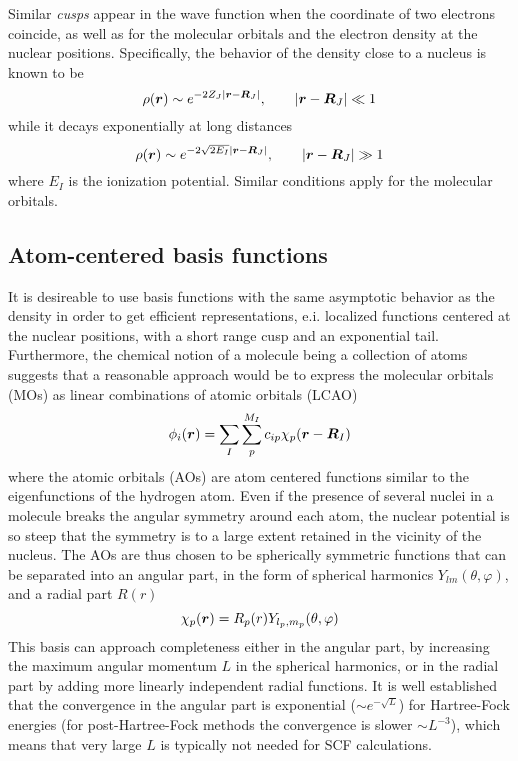 Similar \emph{cusps} appear in the wave function when the coordinate of two electrons coincide, 
as well as for the molecular orbitals and the electron density at the nuclear positions. 
Specifically, the behavior of the density close to a nucleus is known to be
\begin{equation}
    \rho(\boldsymbol r) \sim e^{-2Z_J|\boldsymbol r-\boldsymbol R_J|}, \qquad |\boldsymbol r-\boldsymbol R_J| \ll 1
\end{equation}
while it decays exponentially at long distances 
\begin{equation}
    \rho(\boldsymbol r) \sim e^{-2\sqrt{2E_I}|\boldsymbol r-\boldsymbol R_J|}, \qquad |\boldsymbol r - \boldsymbol R_J| \gg 1
\end{equation}
where $E_I$ is the ionization potential. Similar conditions apply for the molecular orbitals.

\subsection{Atom-centered basis functions}
It is desireable to use basis functions with the same asymptotic behavior as the density in order 
to get efficient representations, e.i. localized functions centered at the nuclear positions, with 
a short range cusp and an exponential tail. Furthermore, the chemical notion of a molecule being 
a collection of atoms suggests that a reasonable approach would be to express the molecular orbitals 
(MOs) as linear combinations of atomic orbitals (LCAO)
\begin{equation}
    \phi_i(\boldsymbol r) = \sum_I\sum_p^{M_I} c_{ip}\chi_p(\boldsymbol r-\boldsymbol R_I) 
\end{equation}
where the atomic orbitals (AOs) are atom centered functions similar to the eigenfunctions of the 
hydrogen atom. Even if the presence of several nuclei in a molecule breaks the angular symmetry
around each atom, the nuclear potential is so steep that the symmetry is to a large extent retained
in the vicinity of the nucleus. The AOs are thus chosen to be spherically symmetric functions that 
can be separated into an angular part, in the form of spherical harmonics $Y_{lm}(\theta,\varphi)$, 
and a radial part $R(r)$
\begin{equation}
    \chi_p (\boldsymbol r) = R_p(r)Y_{l_p,m_p}(\theta,\varphi)
\end{equation}
This basis can approach completeness either in the angular part, by increasing the maximum angular 
momentum $L$ in the spherical harmonics, or in the radial part by adding more linearly independent
radial functions. It is well established that the convergence in the angular part is exponential
($\sim e^{-\sqrt{L}}$) for Hartree-Fock energies (for post-Hartree-Fock methods the convergence is 
slower $\sim L^{-3}$), which means that very large $L$ is typically not needed for SCF calculations. 

